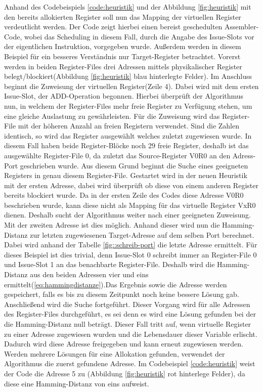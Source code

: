 Anhand des Codebeispiels \ref{code:heuristik} und der Abbildung \ref{fig:heuristik} mit den bereits allokierten Register soll nun das Mapping der virtuellen Register verdeutlicht werden.
Der Code zeigt hierbei einen bereist geschedulten Assembler-Code, wobei das Scheduling in diesem Fall, durch die Angabe des Issue-Slots vor der eigentlichen Instruktion, vorgegeben wurde. Außerdem werden in diesem Beispiel für ein besseres Verständnis nur Target-Register betrachtet.
Vorerst werden in beiden Register-Files drei Adressen mittels physikalischer Register belegt/blockiert(Abbildung \ref{fig:heuristik} blau hinterlegte Felder). Im Anschluss beginnt die Zuweisung der virtuellen Register(Zeile 4).
Dabei wird mit dem ersten Issue-Slot, der ADD-Operation begonnen. Hierbei  überprüft der Algorithmus nun, in welchem der Register-Files mehr freie Register zu Verfügung stehen, um eine gleiche Auslastung zu gewährleisten. Für die Zuweisung wird das Register-File mit der höheren Anzahl an freien Registern verwendet. Sind die Zahlen identisch, so wird das Register ausgewählt welches zuletzt zugewiesen wurde. In diesem Fall haben beide Register-Blöcke noch 29 freie Register, deshalb ist das ausgewählte Register-File 0, da zuletzt das Source-Register V0R0 an den Adress-Port geschrieben wurde.
Aus diesem Grund beginnt die Suche eines geeigneten Registers in genau diesem Register-File. Gestartet wird in der neuen Heuristik mit der ersten Adresse, dabei wird überprüft ob diese von einem anderen Register bereits blockiert wurde. Da in der ersten Zeile des Codes diese Adresse V0R0 beschrieben wurde, kann diese nicht als Mapping für das virtuelle Register VxR0 dienen. Deshalb sucht der Algorithmus weiter nach einer geeigneten Zuweisung. Mit der zweiten Adresse ist dies möglich. Anhand dieser wird nun die Hamming-Distanz zur letzten zugewiesenen Target-Adresse auf dem selben Port berechnet. Dabei wird anhand der Tabelle \ref{fig::schreib-port} die letzte Adresse ermittelt. Für dieses Beispiel ist dies trivial, denn Issue-Slot 0 schreibt immer an Register-File 0 und Issue-Slot 1 an das benachbarte Register-File. Deshalb wird die Hamming-Distanz aus den beiden Adressen vier und eins ermittelt(\ref{eq:hammingdistanze}).Das Ergebnis sowie die Adresse werden gespeichert, falls es bis zu diesem Zeitpunkt noch keine bessere Lösung gab. Anschließend wird die Suche fortgeführt. Dieser Vorgang wird für alle Adressen des Register-Files durchgeführt, es sei denn es wird eine Lösung gefunden bei der die Hamming-Distanz null beträgt. Dieser Fall tritt auf, wenn virtuelle Register zu einer Adresse zugewiesen wurden und die Lebensdauer dieser Variable erlischt. Dadurch wird diese Adresse freigegeben und kann erneut zugewiesen werden.  Werden mehrere Lösungen für eine Allokation gefunden, verwendet der Algorithmus die zuerst gefundene Adresse. Im Codebeispiel \ref{code:heuristik} weist der Code die Adresse 5 zu (Abbildung \ref{fig:heuristik} rot hinterlege Felder), da diese eine Hamming-Distanz von eins aufweist.
